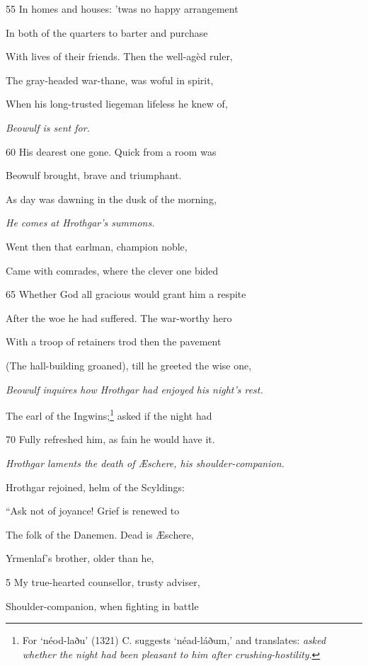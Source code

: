 55
In homes and houses: ’twas no happy arrangement

In both of the quarters to barter and purchase

With lives of their friends. Then the well-agèd ruler,

The gray-headed war-thane, was woful in spirit,

When his long-trusted liegeman lifeless he knew of,

\emph{Beowulf is sent
for.}

60
His dearest one gone. Quick from a room was

Beowulf brought, brave and triumphant.

As day was dawning in the dusk of the morning,

\emph{He comes at
Hrothgar’s summons.}

Went then that earlman, champion noble,

Came with comrades, where the clever one bided

65
Whether God all gracious would grant him a respite

After the woe he had suffered. The war-worthy hero

With a troop of retainers trod then the pavement

(The hall-building groaned), till he greeted the wise one,

\emph{Beowulf inquires
how Hrothgar had
enjoyed his night’s
rest.}

The earl of the Ingwins;\footnote{For ‘néod-laðu’ (1321) C. suggests ‘néad-láðum,’ and translates: \emph{asked
whether the night had been pleasant to him after crushing-hostility}.} asked if the night had

70
Fully refreshed him, as fain he would have it.



\emph{Hrothgar laments
the death of Æschere,
his shoulder-companion.}

Hrothgar rejoined, helm of the Scyldings:

“Ask not of joyance! Grief is renewed to

The folk of the Danemen. Dead is Æschere,

Yrmenlaf’s brother, older than he,

5
My true-hearted counsellor, trusty adviser,

Shoulder-companion, when fighting in battle

